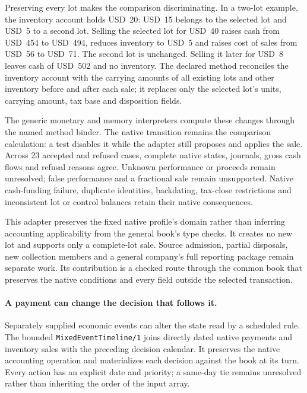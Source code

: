 Preserving every lot makes the comparison discriminating. In a two-lot example,
the inventory account holds USD~20: USD~15 belongs to the selected lot and USD~5
to a second lot. Selling the selected lot for USD~40 raises cash from USD~454
to USD~494, reduces inventory to USD~5 and raises cost of sales from USD~56 to
USD~71. The second lot is unchanged. Selling it later for USD~8 leaves cash of
USD~502 and no inventory. The declared method reconciles the inventory account
with the carrying amounts of all existing lots and other inventory before and
after each sale; it replaces only the selected lot's units, carrying amount,
tax base and disposition fields.

The generic monetary and memory interpreters compute these changes through the
named method binder. The native transition remains the comparison calculation:
a test disables it while the adapter still proposes and applies the sale. Across
23 accepted and refused cases, complete native states, journals, gross cash flows
and refusal reasons agree. Unknown performance or proceeds remain unresolved;
false performance and a fractional sale remain unsupported. Native cash-funding
failure, duplicate identities, backdating, tax-close restrictions and inconsistent
lot or control balances retain their native consequences.

This adapter preserves the fixed native profile's domain rather than inferring
accounting applicability from the general book's type checks. It creates no new
lot and supports only a complete-lot sale. Source admission, partial disposals,
new collection members and a general company's full reporting package remain
separate work. Its contribution is a checked route through the common book that
preserves the native conditions and every field outside the selected transaction.

\paragraph{A payment can change the decision that follows it.}
Separately supplied economic events can alter the state read by a scheduled
rule. The bounded \texttt{MixedEventTimeline/1} joins directly dated native
payments and inventory sales with the preceding decision calendar. It preserves
the native accounting operation and materializes each decision against the book
at its turn. Every action has an explicit date and priority; a same-day tie
remains unresolved rather than inheriting the order of the input array.

